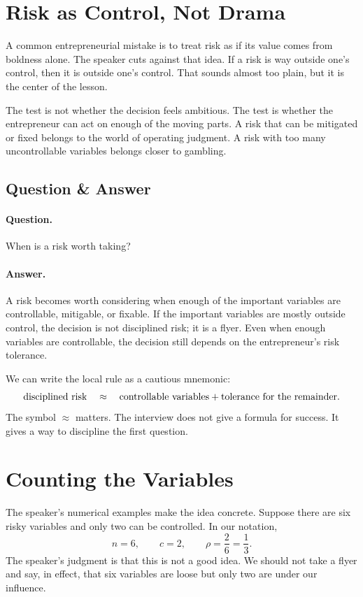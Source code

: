 \section{Risk as Control, Not Drama}

A common entrepreneurial mistake is to treat risk as if its value comes from boldness alone. The speaker cuts against that idea. If a risk is way outside one's control, then it is outside one's control. That sounds almost too plain, but it is the center of the lesson.

The test is not whether the decision feels ambitious. The test is whether the entrepreneur can act on enough of the moving parts. A risk that can be mitigated or fixed belongs to the world of operating judgment. A risk with too many uncontrollable variables belongs closer to gambling.

\subsection{Question \& Answer}

\paragraph{Question.}
When is a risk worth taking?

\paragraph{Answer.}
A risk becomes worth considering when enough of the important variables are controllable, mitigable, or fixable. If the important variables are mostly outside control, the decision is not disciplined risk; it is a flyer. Even when enough variables are controllable, the decision still depends on the entrepreneur's risk tolerance.

We can write the local rule as a cautious mnemonic:
\begin{equation}
\hbox{disciplined risk}
\quad \approx \quad
\hbox{controllable variables}
+
\hbox{tolerance for the remainder}.
\end{equation}
The symbol \(\approx\) matters. The interview does not give a formula for success. It gives a way to discipline the first question.

\section{Counting the Variables}

The speaker's numerical examples make the idea concrete. Suppose there are six risky variables and only two can be controlled. In our notation,
\begin{equation}
n=6,\qquad c=2,\qquad \rho=\frac{2}{6}=\frac{1}{3}.
\end{equation}
The speaker's judgment is that this is not a good idea. We should not take a flyer and say, in effect, that six variables are loose but only two are under our influence.

